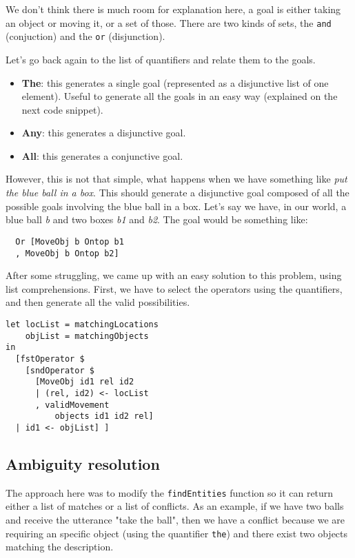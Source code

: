 \documentclass[11pt]{article}
\begin{document}
          We don't think there is much room for explanation here, a goal is either taking an object or moving it, or a set of those. There are two kinds of sets, the \texttt{and} (conjuction) and the \texttt{or} (disjunction).

          Let's go back again to the list of quantifiers and relate them to the goals.

          \begin{itemize}
            \item {\bf The}: this generates a single goal (represented as a disjunctive list of one element). Useful to generate all the goals in an easy way (explained on the next code snippet).
            \item {\bf Any}: this generates a disjunctive goal.
            \item {\bf All}: this generates a conjunctive goal.
          \end{itemize}

          However, this is not that simple, what happens when we have something like \textit{put the blue ball in a box}. This should generate a disjunctive goal composed of all the possible
          goals involving the blue ball in a box. Let's say we have, in our world, a blue ball \textit{b}
          and two boxes \textit{b1} and \textit{b2}. The goal would be something like:

\begin{verbatim}
  Or [MoveObj b Ontop b1
  , MoveObj b Ontop b2]
\end{verbatim}

          After some struggling, we came up with an easy solution to this problem, using list comprehensions.
          First, we have to select the operators using the quantifiers, and then generate all the valid possibilities.

\begin{verbatim}
let locList = matchingLocations
    objList = matchingObjects
in
  [fstOperator $
    [sndOperator $ 
      [MoveObj id1 rel id2
      | (rel, id2) <- locList
      , validMovement 
          objects id1 id2 rel]
  | id1 <- objList] ]
\end{verbatim}
	
        \subsection{Ambiguity resolution}
          The approach here was to modify the \texttt{findEntities} function so it can return
           either a list of matches or a list of conflicts. As an example, if we have two 
           balls and receive the utterance "take the ball", then we have a conflict because 
           we are requiring an specific object (using the quantifier \texttt{the}) and there            exist two objects matching the description.
\end{document}
